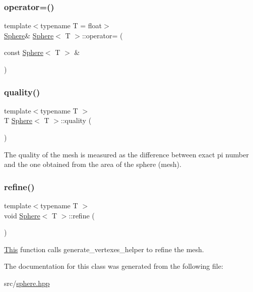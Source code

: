 \mbox{\label{classSphere_ae989d05c3ea71f5a758e90e2f2e3aecf}} 
\subsubsection{\texorpdfstring{operator=()}{operator=()}\hspace{0.1cm}{\footnotesize\ttfamily [2/2]}}
{\footnotesize\ttfamily template$<$typename T = float$>$ \\
\mbox{\hyperlink{classSphere}{Sphere}}\& \mbox{\hyperlink{classSphere}{Sphere}}$<$ T $>$\+::operator= (\begin{DoxyParamCaption}\item[{const \mbox{\hyperlink{classSphere}{Sphere}}$<$ T $>$ \&}]{ }\end{DoxyParamCaption})\hspace{0.3cm}{\ttfamily [default]}}

\mbox{\label{classSphere_a9ebc65dabaf8d87fbe599f4b64816f73}} 
\subsubsection{\texorpdfstring{quality()}{quality()}}
{\footnotesize\ttfamily template$<$typename T $>$ \\
T \mbox{\hyperlink{classSphere}{Sphere}}$<$ T $>$\+::quality (\begin{DoxyParamCaption}{ }\end{DoxyParamCaption})}



The quality of the mesh is measured as the difference between exact pi number and the one obtained from the area of the sphere (mesh). 

\mbox{\label{classSphere_a3f5ee2b07e48a360696fe983690d1d1f}} 
\subsubsection{\texorpdfstring{refine()}{refine()}}
{\footnotesize\ttfamily template$<$typename T $>$ \\
void \mbox{\hyperlink{classSphere}{Sphere}}$<$ T $>$\+::refine (\begin{DoxyParamCaption}{ }\end{DoxyParamCaption})}



\mbox{\hyperlink{classThis}{This}} function calls generate\+\_\+vertexes\+\_\+helper to refine the mesh. 



The documentation for this class was generated from the following file\+:\begin{DoxyCompactItemize}
\item 
src/\mbox{\hyperlink{sphere_8hpp}{sphere.\+hpp}}\end{DoxyCompactItemize}
